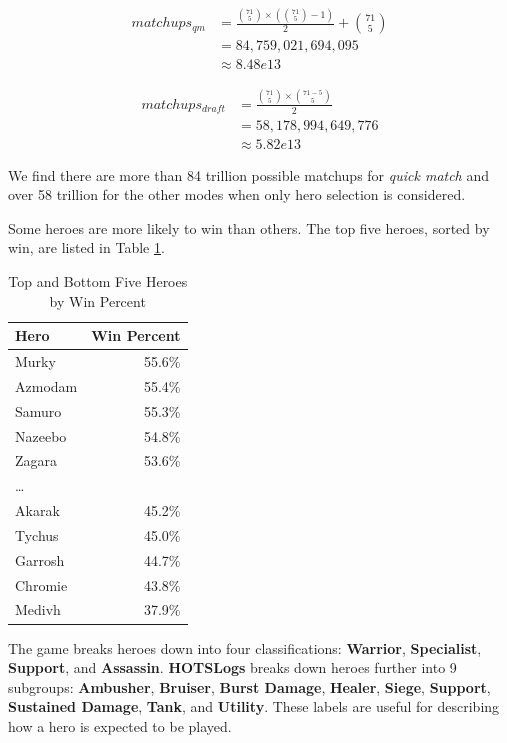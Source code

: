 \documentclass[twoside,twocolumn]{article}
\begin{document}
\begin{equation}
\label{equation:qmmatchups}
\begin{aligned}
matchups_{qm} &= \frac{{71 \choose 5}\times({71 \choose 5}-1)}{2} + {71 \choose 5} \\
&= 84,759,021,694,095 \\
&\approx{8.48e13}
\end{aligned}
\end{equation}

\begin{equation}
\label{equation:draftmatchups}
\begin{aligned}
matchups_{draft} &= \frac{{71 \choose 5}\times{71-5 \choose 5}}{2} \\
&= 58,178,994,649,776 \\
&\approx{5.82e13}
\end{aligned}
\end{equation}

We find there are more than 84 trillion possible matchups for \textit{quick match} and over 58 trillion for the other modes when only hero selection is considered.

Some heroes are more likely to win than others.  The top five heroes, sorted by win, are listed in Table \ref{table:winpercent}.

\begin{table}[h]
\caption{Top and Bottom Five Heroes by Win Percent}
\label{table:winpercent}
\centering
\begin{tabular}{lr}
\toprule
Hero & Win Percent \\
\midrule
Murky & 55.6\% \\
Azmodam & 55.4\% \\
Samuro & 55.3\% \\
Nazeebo & 54.8\% \\
Zagara & 53.6\% \\
\dots \\
Akarak & 45.2\% \\
Tychus & 45.0\% \\
Garrosh & 44.7\% \\
Chromie & 43.8\% \\
Medivh & 37.9\% \\
\bottomrule
\end{tabular}
\end{table}


The game breaks heroes down into four classifications: \textbf{Warrior}, \textbf{Specialist}, \textbf{Support}, and \textbf{Assassin}.  \textbf{HOTSLogs} breaks down heroes further into 9 subgroups:  \textbf{Ambusher},  \textbf{Bruiser},  \textbf{Burst Damage},  \textbf{Healer},  \textbf{Siege},  \textbf{Support},  \textbf{Sustained Damage},  \textbf{Tank}, and  \textbf{Utility}.  These labels are useful for describing how a hero is expected to be played.  
\end{document}

